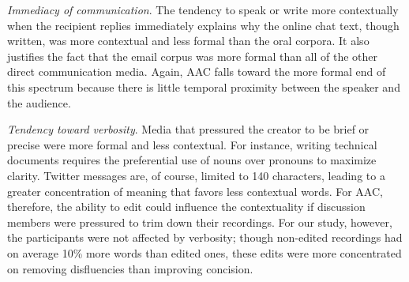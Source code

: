 \emph{Immediacy of communication}. 
The tendency to speak or write more contextually when the recipient replies immediately explains why the online chat text, though written, was more contextual and less formal than the oral corpora. 
It also justifies the fact that the email corpus was more formal than all of the other direct communication media.
Again, AAC falls toward the more formal end of this spectrum because there is little temporal proximity between the speaker and the audience.

\emph{Tendency toward verbosity}.
Media that pressured the creator to be brief or precise were more formal and less contextual.
For instance, writing technical documents requires the preferential use of nouns over pronouns to maximize clarity.
Twitter messages are, of course, limited to 140 characters, leading to a greater concentration of meaning that favors less contextual words.
For AAC, therefore, the ability to edit could influence the contextuality if discussion members were pressured to trim down their recordings. 
For our study, however, the participants were not affected by verbosity; though non-edited recordings had on average 10\% more words than edited ones, these edits were more concentrated on removing disfluencies than improving concision.